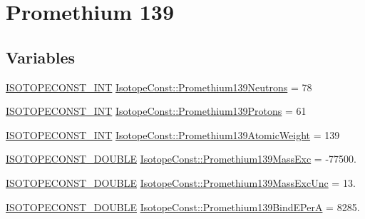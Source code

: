 \hypertarget{group___isotope_const-_promethium-_pm139}{}\section{Promethium 139}
\label{group___isotope_const-_promethium-_pm139}
\subsection*{Variables}
\begin{DoxyCompactItemize}
\item 
\mbox{\hyperlink{group___isotope_const-_macros_ga5f18360b3e99483a35c32d789e62621c}{I\+S\+O\+T\+O\+P\+E\+C\+O\+N\+S\+T\+\_\+\+I\+NT}} \mbox{\hyperlink{group___isotope_const-_promethium-_pm139_ga6f6941b4905c6a5166a3ea8a9bbcf442}{Isotope\+Const\+::\+Promethium139\+Neutrons}} = 78
\item 
\mbox{\hyperlink{group___isotope_const-_macros_ga5f18360b3e99483a35c32d789e62621c}{I\+S\+O\+T\+O\+P\+E\+C\+O\+N\+S\+T\+\_\+\+I\+NT}} \mbox{\hyperlink{group___isotope_const-_promethium-_pm139_ga45a8746a3d64e45d05535f1e9b475797}{Isotope\+Const\+::\+Promethium139\+Protons}} = 61
\item 
\mbox{\hyperlink{group___isotope_const-_macros_ga5f18360b3e99483a35c32d789e62621c}{I\+S\+O\+T\+O\+P\+E\+C\+O\+N\+S\+T\+\_\+\+I\+NT}} \mbox{\hyperlink{group___isotope_const-_promethium-_pm139_ga66a82081f8352ef61013e83b0e5660cb}{Isotope\+Const\+::\+Promethium139\+Atomic\+Weight}} = 139
\item 
\mbox{\hyperlink{group___isotope_const-_macros_ga8f45a7272ce02c0b4c65c44636ed719a}{I\+S\+O\+T\+O\+P\+E\+C\+O\+N\+S\+T\+\_\+\+D\+O\+U\+B\+LE}} \mbox{\hyperlink{group___isotope_const-_promethium-_pm139_ga41bf00a8a4cbdc52410307c23c380372}{Isotope\+Const\+::\+Promethium139\+Mass\+Exc}} = -\/77500.
\item 
\mbox{\hyperlink{group___isotope_const-_macros_ga8f45a7272ce02c0b4c65c44636ed719a}{I\+S\+O\+T\+O\+P\+E\+C\+O\+N\+S\+T\+\_\+\+D\+O\+U\+B\+LE}} \mbox{\hyperlink{group___isotope_const-_promethium-_pm139_ga01009bc8539823575fe67d4f36a90117}{Isotope\+Const\+::\+Promethium139\+Mass\+Exc\+Unc}} = 13.
\item 
\mbox{\hyperlink{group___isotope_const-_macros_ga8f45a7272ce02c0b4c65c44636ed719a}{I\+S\+O\+T\+O\+P\+E\+C\+O\+N\+S\+T\+\_\+\+D\+O\+U\+B\+LE}} \mbox{\hyperlink{group___isotope_const-_promethium-_pm139_ga2595aae21247853d985347c5cdd3cc79}{Isotope\+Const\+::\+Promethium139\+Bind\+E\+PerA}} = 8285.

\end{DoxyCompactItemize}

